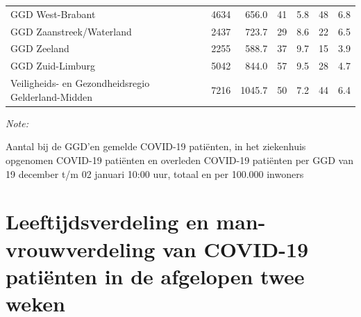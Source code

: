 \documentclass[
  english,
  man,floatsintext]{apa6}
\begin{document}
\begin{table}[H]
\begin{threeparttable}
\begin{tabular}{lrrrrrr}
GGD West-Brabant & 4634 & 656.0 & 41 & 5.8 & 48 & 6.8\\
GGD Zaanstreek/Waterland & 2437 & 723.7 & 29 & 8.6 & 22 & 6.5\\
GGD Zeeland & 2255 & 588.7 & 37 & 9.7 & 15 & 3.9\\
GGD Zuid-Limburg & 5042 & 844.0 & 57 & 9.5 & 28 & 4.7\\
Veiligheids- en Gezondheidsregio Gelderland-Midden & 7216 & 1045.7 & 50 & 7.2 & 44 & 6.4\\
\bottomrule
\end{tabular}
\begin{tablenotes}
\item \textit{Note: } 
\item Aantal bij de GGD’en gemelde COVID-19 patiënten, in het ziekenhuis opgenomen COVID-19 patiënten en overleden COVID-19 patiënten per GGD van 19 december t/m 02 januari 10:00 uur, totaal en per 100.000 inwoners
\end{tablenotes}
\end{threeparttable}
\endgroup{}
\end{table}

\newpage

\hypertarget{leeftijdsverdeling-en-man-vrouwverdeling-van-covid-19-patiuxebnten-in-de-afgelopen-twee-weken}{%
\section{Leeftijdsverdeling en man-vrouwverdeling van COVID-19 patiënten in de afgelopen twee weken}\label{leeftijdsverdeling-en-man-vrouwverdeling-van-covid-19-patiuxebnten-in-de-afgelopen-twee-weken}}
\end{document}
